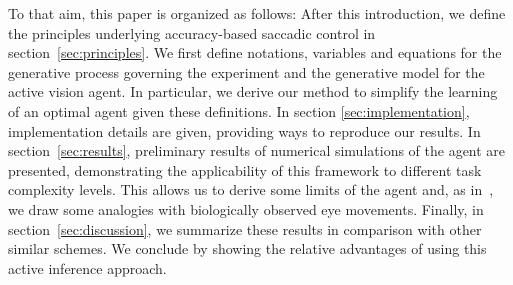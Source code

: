 To that aim, this paper is organized as follows: After this introduction, we define the principles underlying accuracy-based saccadic control in section~\ref{sec:principles}. We first define notations, variables and equations for the generative process governing the experiment and the generative model for the active vision agent. In particular, we derive our method to simplify the learning of an optimal agent given these definitions. In section \ref{sec:implementation}, implementation details are given, providing ways to reproduce our results. In section~\ref{sec:results}, preliminary results of numerical simulations of the agent are presented, demonstrating the applicability of this framework to different task complexity levels. This allows us to derive some limits of the agent and, as in~\citep{Najemnik05}, we draw some analogies with biologically observed eye movements. Finally, in section~\ref{sec:discussion}, we summarize these results in comparison with other similar schemes. We conclude by showing the relative advantages of using this active inference approach.
